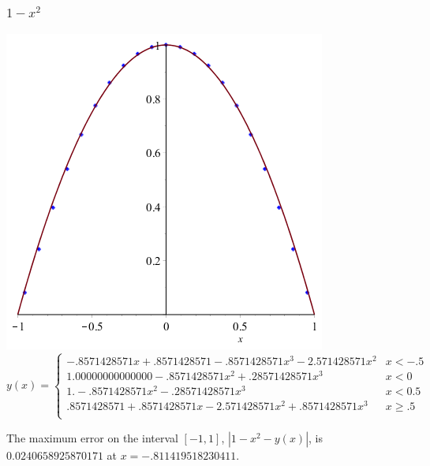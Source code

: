 \documentclass[11pt]{article} %
\begin{document}
\subsubsection*{$1-x^2$}
\includegraphics[scale=.3]{plots/dataset3approx.png}
$$
y(x) = \left\{
        \begin{array}{ll}
            -.8571428571x+.8571428571-.8571428571x^3-2.571428571x^2 &  x < -.5 \\
           1.00000000000000-.8571428571x^2+.28571428571x^3 & x < 0 \\
 	1.-.8571428571x^2-.28571428571x^3 &  x < 0.5 \\
 	.8571428571+.8571428571x-2.571428571x^2+.8571428571x^3 &  x \geq .5 \\
        \end{array}
    \right.
$$

The maximum error on the interval $[-1,1]$, $|1-x^2 - y(x)|$, is $0.0240658925870171$ at $x = -.811419518230411$.
\end{document}
